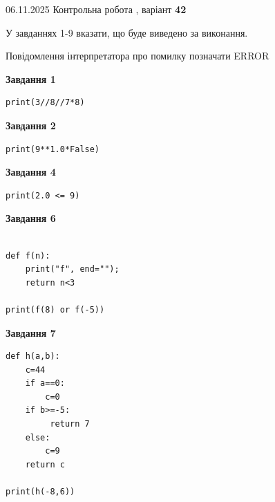 \documentclass[12pt, ukrainian]{article}
\begin{document}
{\Large{06.11.2025 Контрольна робота , варіант  \No \textbf { 42 }\par}}
{
\begin {large}
У завданнях 1-9 вказати, що буде виведено за виконання.

Повідомлення інтерпретатора про помилку позначати ERROR

\begin{minipage}[t]{7.5cm}

\begin{center}
\textbf{Завдання 1}
\end{center}

\begin{verbatim}
print(3//8//7*8)
\end{verbatim}



\begin{center}
\textbf{Завдання 2}
\end{center}

\begin{verbatim}
print(9**1.0*False)
\end{verbatim}



\begin{center}
\textbf{Завдання 4}
\end{center}

\begin{verbatim}
print(2.0 <= 9)
\end{verbatim}



\begin{center}
\textbf{Завдання 6}
\end{center}

\begin{verbatim}

def f(n):
    print("f", end="");
    return n<3

print(f(8) or f(-5))
\end{verbatim}



\begin{center}
\textbf{Завдання 7}
\end{center}

\begin{verbatim}
def h(a,b):
    c=44
    if a==0:
        c=0
    if b>=-5:
         return 7
    else: 
        c=9
    return c

print(h(-8,6))
\end{verbatim}


\end{minipage}
\end{large}}
\end{document}

